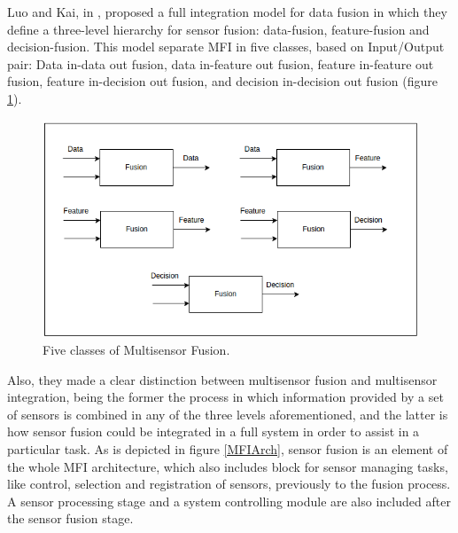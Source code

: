 Luo and Kai, in \cite{Luo1989, Luo1990}, proposed a full integration model for data fusion in which they define a three-level hierarchy for sensor fusion: data-fusion, feature-fusion and decision-fusion. This model separate MFI in five classes, based on Input/Output pair: Data in-data out fusion, data in-feature out fusion, feature in-feature out fusion, feature in-decision out fusion, and decision in-decision out fusion \cite{Luo2011} (figure \ref{fusionClasses}).

\begin{figure}[ht!]
\centering
\includegraphics[scale=0.25]{fig/2/fusionClasses.png}
\caption{Five classes of Multisensor Fusion.}
\label{fusionClasses}
\end{figure}

Also, they made a clear distinction between multisensor fusion and multisensor integration, being the former the process in which information provided by a set of sensors is combined in any of the three levels aforementioned, and the latter is how sensor fusion could be integrated in a full system in order to assist in a particular task. As is depicted in figure \ref{MFIArch}, sensor fusion is an element of the whole MFI architecture, which also includes block for sensor managing tasks, like control, selection and registration of sensors, previously to the fusion process. A sensor processing stage and a system controlling module are also included after the sensor fusion stage.

